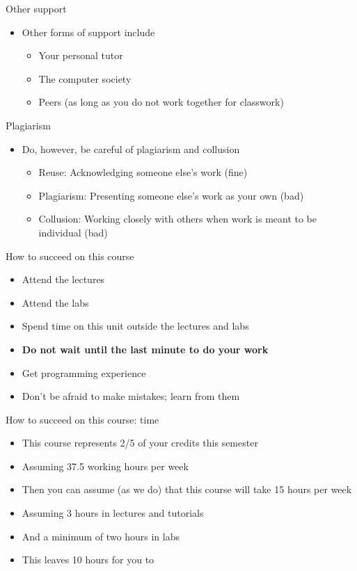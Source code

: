 \documentclass{beamer}
\begin{document}
\begin{frame}
Other support
\begin{itemize}
\item Other forms of support include 
\begin{itemize}
\item Your personal tutor
\item The computer society
\item Peers (as long as you do not work together for classwork)
\end{itemize}
\end{itemize}
\end{frame} \begin{frame}

Plagiarism

\begin{itemize}
\item Do, however, be careful of plagiarism and collusion

\begin{itemize}
\item Reuse: Acknowledging someone else's work (fine)
\item Plagiarism: Presenting someone else's work as your own (bad)
\item Collusion: Working closely with others when work is meant to be individual (bad)
\end{itemize}
\end{itemize}
\end{frame} \begin{frame}

How to succeed on this course

\begin{itemize}
\item Attend the lectures
\item Attend the labs
\item Spend time on this unit outside the lectures and labs
\item \textbf{Do not wait until the last minute to do your work}
\item Get programming experience
\item Don't be afraid to make mistakes; learn from them
\end{itemize}
\end{frame} \begin{frame}

How to succeed on this course: time

\begin{itemize}
\item This course represents 2/5 of your credits this semester
\item Assuming 37.5 working hours per week
\item Then you can assume (as we do) that this course will take 15 hours per week
\item Assuming 3 hours in lectures and tutorials
\item And a minimum of two hours in labs
\item This leaves 10 hours for you to 


\end{itemize}
\end{frame}
\end{document}
